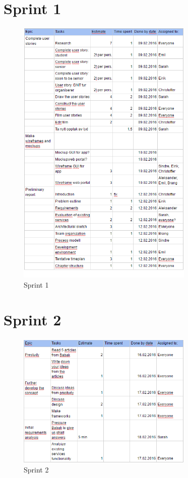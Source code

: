 \section{Sprint 1}\label{sprint1}

\begin{figure}[H]
\centering
\includegraphics[width = 0.75\textwidth]{Figures/sprints/sprint1}
\caption{Sprint 1}
    \label{fig:SP1}
    \end{figure}

\section{Sprint 2}\label{sprint2}

\begin{figure}[H]
\centering
\includegraphics[width = 0.75\textwidth]{Figures/sprints/sprint2}
\caption{Sprint 2}
    \label{fig:SP2}
    \end{figure}

